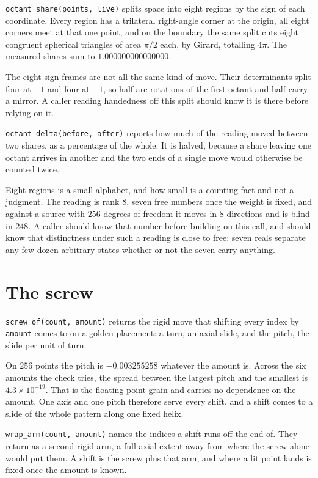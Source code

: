 \texttt{octant\_share(points, live)} splits space into eight regions by the sign of each coordinate. Every region has a trilateral right-angle corner at the origin, all eight corners meet at that one point, and on the boundary the same split cuts eight congruent spherical triangles of area \(\pi/2\) each, by Girard, totalling \(4\pi\). The measured shares sum to \(1.000000000000000\).

The eight sign frames are not all the same kind of move. Their determinants split four at \(+1\) and four at \(-1\), so half are rotations of the first octant and half carry a mirror. A caller reading handedness off this split should know it is there before relying on it.

\texttt{octant\_delta(before, after)} reports how much of the reading moved between two shares, as a percentage of the whole. It is halved, because a share leaving one octant arrives in another and the two ends of a single move would otherwise be counted twice.

Eight regions is a small alphabet, and how small is a counting fact and not a judgment. The reading is rank \(8\), seven free numbers once the weight is fixed, and against a source with \(256\) degrees of freedom it moves in \(8\) directions and is blind in \(248\). A caller should know that number before building on this call, and should know that distinctness under such a reading is close to free: seven reals separate any few dozen arbitrary states whether or not the seven carry anything.

\section{The screw}

\texttt{screw\_of(count, amount)} returns the rigid move that shifting every index by \texttt{amount} comes to on a golden placement: a turn, an axial slide, and the pitch, the slide per unit of turn.

On \(256\) points the pitch is \(-0.003255258\) whatever the amount is. Across the six amounts the check tries, the spread between the largest pitch and the smallest is \(4.3 \times 10^{-19}\). That is the floating point grain and carries no dependence on the amount. One axis and one pitch therefore serve every shift, and a shift comes to a slide of the whole pattern along one fixed helix.

\texttt{wrap\_arm(count, amount)} names the indices a shift runs off the end of. They return as a second rigid arm, a full axial extent away from where the screw alone would put them. A shift is the screw plus that arm, and where a lit point lands is fixed once the amount is known.

